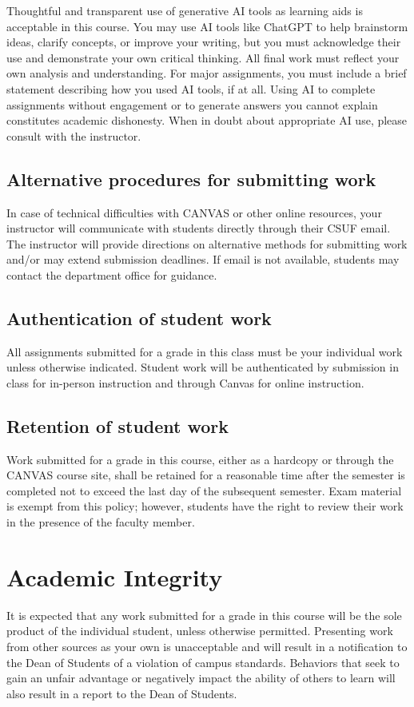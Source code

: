 \documentclass{syllabus}
\begin{document}
Thoughtful and transparent use of generative AI tools as learning aids is acceptable in this course. You may use AI tools like ChatGPT to help brainstorm ideas, clarify concepts, or improve your writing, but you must acknowledge their use and demonstrate your own critical thinking. All final work must reflect your own analysis and understanding. For major assignments, you must include a brief statement describing how you used AI tools, if at all. Using AI to complete assignments without engagement or to generate answers you cannot explain constitutes academic dishonesty. When in doubt about appropriate AI use, please consult with the instructor.

\subsection*{Alternative procedures for submitting work}

 In case of technical
difficulties with CANVAS or other online resources, your instructor will
communicate with students directly through their CSUF email. The instructor
will provide directions on alternative methods for submitting work and/or
may extend submission deadlines. If email is not available, students may
contact the department office for guidance.

\subsection*{Authentication of student work}

 All assignments submitted for a grade in this class must be your individual work
unless otherwise indicated. Student work will be authenticated by submission in class for in-person instruction and through Canvas for online instruction.

\subsection*{Retention of student work}

Work submitted for a grade in this course, either as a hardcopy or through the
CANVAS course site, shall be retained for a reasonable time after the
semester is completed not to exceed the last day of the subsequent
semester. Exam material is exempt from this policy; however, students have
the right to review their work in the presence of the faculty member. 

\section*{Academic Integrity}
It is expected that any work submitted for a grade in this course will be the sole
product of the individual student, unless otherwise permitted. Presenting
work from other sources as your own is unacceptable and will result in a
notification to the Dean of Students of a violation of campus standards.
Behaviors that seek to gain an unfair advantage or negatively impact the ability of others to learn will also result in a report to the Dean of
Students.
\end{document}
